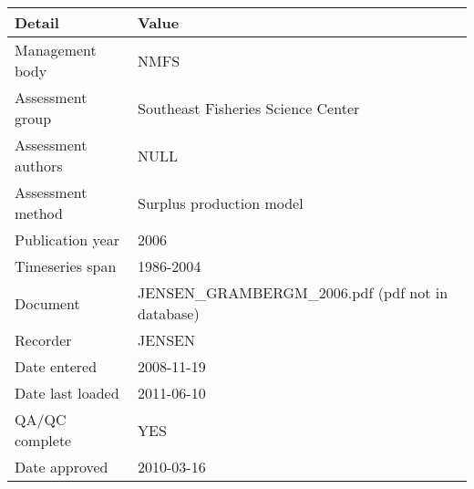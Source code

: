 \begin{table}[htb]
\centering
\begin{tabular}{lp{7cm}}
\toprule
Detail & Value \\
\midrule
Management body    & NMFS                                              \\
Assessment group   & Southeast Fisheries Science Center                \\
Assessment authors & NULL                                              \\
Assessment method  & Surplus production model                          \\
Publication year   & 2006                                              \\
Timeseries span    & 1986-2004                                         \\
Document           & JENSEN\_GRAMBERGM\_2006.pdf (pdf not in database) \\
Recorder           & JENSEN                                            \\
Date entered       & 2008-11-19                                        \\
Date last loaded   & 2011-06-10                                        \\
QA/QC complete     & YES                                               \\
Date approved      & 2010-03-16                                        \\
\bottomrule
\end{tabular}
\label{tab:assessdet}
\end{table}
